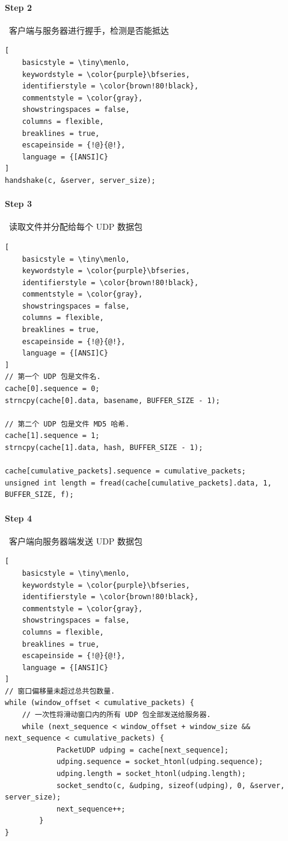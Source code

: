 \documentclass{article}
\begin{document}
\paragraph*{Step 2}~{客户端与服务器进行握手，检测是否能抵达}
\begin{lstlisting}[
    basicstyle = \tiny\menlo,
    keywordstyle = \color{purple}\bfseries,
    identifierstyle = \color{brown!80!black},
    commentstyle = \color{gray},
    showstringspaces = false,
    columns = flexible,
    breaklines = true,
    escapeinside = {!@}{@!},
    language = {[ANSI]C}
]
handshake(c, &server, server_size);
\end{lstlisting}

\paragraph*{Step 3}~{读取文件并分配给每个 UDP 数据包}
\begin{lstlisting}[
    basicstyle = \tiny\menlo,
    keywordstyle = \color{purple}\bfseries,
    identifierstyle = \color{brown!80!black},
    commentstyle = \color{gray},
    showstringspaces = false,
    columns = flexible,
    breaklines = true,
    escapeinside = {!@}{@!},
    language = {[ANSI]C}
]
// 第一个 UDP 包是文件名.
cache[0].sequence = 0;
strncpy(cache[0].data, basename, BUFFER_SIZE - 1);

// 第二个 UDP 包是文件 MD5 哈希.
cache[1].sequence = 1;
strncpy(cache[1].data, hash, BUFFER_SIZE - 1);

cache[cumulative_packets].sequence = cumulative_packets;
unsigned int length = fread(cache[cumulative_packets].data, 1, BUFFER_SIZE, f);
\end{lstlisting}

\paragraph*{Step 4}~{客户端向服务器端发送 UDP 数据包}
\begin{lstlisting}[
    basicstyle = \tiny\menlo,
    keywordstyle = \color{purple}\bfseries,
    identifierstyle = \color{brown!80!black},
    commentstyle = \color{gray},
    showstringspaces = false,
    columns = flexible,
    breaklines = true,
    escapeinside = {!@}{@!},
    language = {[ANSI]C}
]
// 窗口偏移量未超过总共包数量.
while (window_offset < cumulative_packets) {
    // 一次性将滑动窗口内的所有 UDP 包全部发送给服务器.
    while (next_sequence < window_offset + window_size && next_sequence < cumulative_packets) {
            PacketUDP udping = cache[next_sequence];
            udping.sequence = socket_htonl(udping.sequence);
            udping.length = socket_htonl(udping.length);
            socket_sendto(c, &udping, sizeof(udping), 0, &server, server_size);
            next_sequence++;
        }
}
\end{lstlisting}
\end{document}
